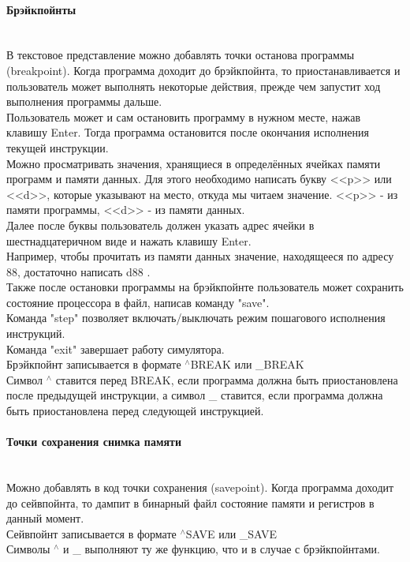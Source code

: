 \paragraph{Брэйкпойнты}~\\
В текстовое представление можно добавлять точки останова программы (breakpoint). Когда программа доходит до брэйкпойнта, то приостанавливается и пользователь может выполнять некоторые действия, прежде чем запустит ход выполнения программы дальше.\\
Пользователь может и сам остановить программу в нужном месте, нажав клавишу Enter. Тогда программа остановится после окончания исполнения текущей инструкции. \\
Можно просматривать значения, хранящиеся в определённых ячейках памяти программ и памяти данных. Для этого необходимо написать букву <<p>> или <<d>>, которые указывают на место, откуда мы читаем значение. <<p>> - из памяти программы, <<d>> - из памяти данных. \\
Далее после буквы пользователь должен указать адрес ячейки в шестнадцатеричном виде и нажать клавишу Enter. \\
Например, чтобы прочитать из памяти данных значение, находящееся по адресу 88, достаточно написать d88 . \\
Также после остановки программы на брэйкпойнте пользователь может сохранить состояние процессора в файл, написав команду "save". \\
Команда "step" позволяет включать/выключать режим пошагового исполнения инструкций. \\
Команда "exit" завершает работу симулятора. \\
Брэйкпойнт записывается в формате $^\wedge$BREAK или \_BREAK \\
Символ $^\wedge$ ставится перед BREAK, если программа должна быть приостановлена после предыдущей инструкции, а символ \_ ставится, если программа должна быть приостановлена перед следующей инструкцией.

\newpage

\paragraph{Точки сохранения снимка памяти}~\\
Можно добавлять в код точки сохранения (savepoint). Когда программа доходит до сейвпойнта, то дампит в бинарный файл состояние памяти и регистров в данный момент.\\
Сейвпойнт записывается в формате $^\wedge$SAVE или \_SAVE \\
Символы $^\wedge$ и \_ выполняют ту же функцию, что и в случае с брэйкпойнтами. \\


